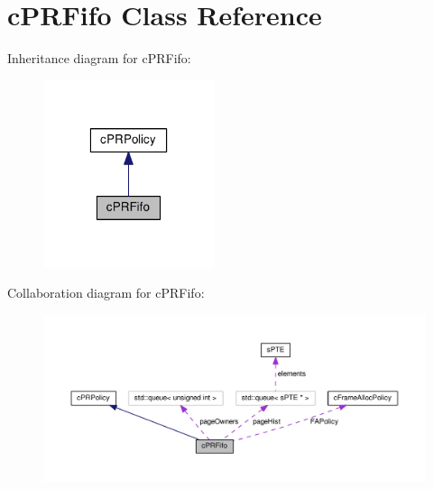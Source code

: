 \hypertarget{classcPRFifo}{\section{c\-P\-R\-Fifo \-Class \-Reference}
\label{db/d3a/classcPRFifo}
}


\-Inheritance diagram for c\-P\-R\-Fifo\-:\nopagebreak
\begin{figure}[H]
\begin{center}
\leavevmode
\includegraphics[width=142pt]{d6/d49/classcPRFifo__inherit__graph}
\end{center}
\end{figure}


\-Collaboration diagram for c\-P\-R\-Fifo\-:\nopagebreak
\begin{figure}[H]
\begin{center}
\leavevmode
\includegraphics[width=350pt]{d9/d21/classcPRFifo__coll__graph}
\end{center}
\end{figure}
